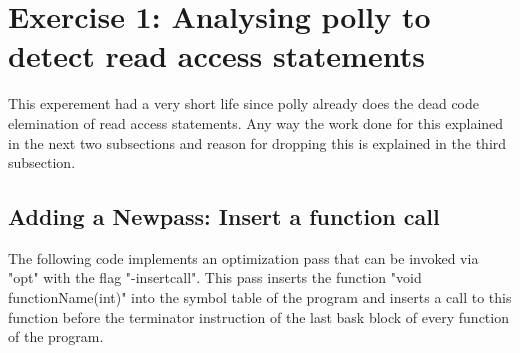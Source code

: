 \documentclass[a4paper,10pt]{article}
\begin{document}
\section{Exercise 1: Analysing polly to detect read access statements}

This experement had a very short life since polly already does the dead code elemination of read access statements. Any way the work done for this explained in the next two subsections and reason for dropping this is explained in the third subsection.
\subsection{Adding a Newpass: Insert a function call}
The following code implements an optimization pass that can be invoked via "opt" with the flag "-insertcall". This pass inserts the function "void functionName(int)" into the symbol table of the program and inserts a call to this function before the terminator instruction of the last bask block of every function of the program. 
\end{document}
